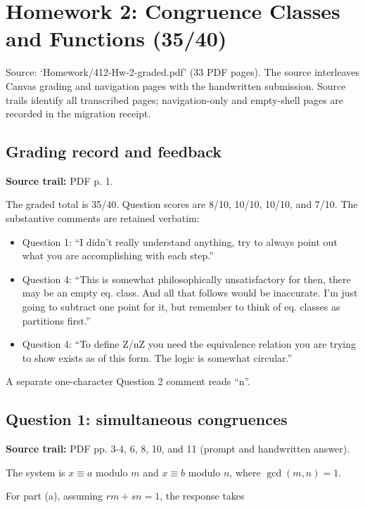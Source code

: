 \chapter{Homework 2: Congruence Classes and Functions (35/40)}\label{homework-02}

Source: `Homework/412-Hw-2-graded.pdf' (33 PDF pages). The source interleaves Canvas grading and navigation pages with the handwritten submission. Source trails identify all transcribed pages; navigation-only and empty-shell pages are recorded in the migration receipt.

\section{Grading record and feedback}

\textbf{Source trail:} PDF p. 1.

The graded total is 35/40. Question scores are 8/10, 10/10, 10/10, and 7/10. The substantive comments are retained verbatim:

\begin{itemize}
\tightlist
\item
  Question 1: ``I didn't really understand anything, try to always point out what you are accomplishing with each step.''
\item
  Question 4: ``This is somewhat philosophically unsatisfactory for then, there may be an empty eq. class. And all that follows would be inaccurate. I'm just going to subtract one point for it, but remember to think of eq. classes as partitions first.''
\item
  Question 4: ``To define Z/nZ you need the equivalence relation you are trying to show exists as of this form. The logic is somewhat circular.''
\end{itemize}

A separate one-character Question 2 comment reads ``n''.

\section{Question 1: simultaneous congruences}

\textbf{Source trail:} PDF pp. 3-4, 6, 8, 10, and 11 (prompt and handwritten answer).

The system is \(x \equiv a\) modulo \(m\) and \(x \equiv b\) modulo \(n\), where \(\gcd\left( {m,n} \right) = 1\).

For part (a), assuming \(rm + sn = 1\), the response takes

